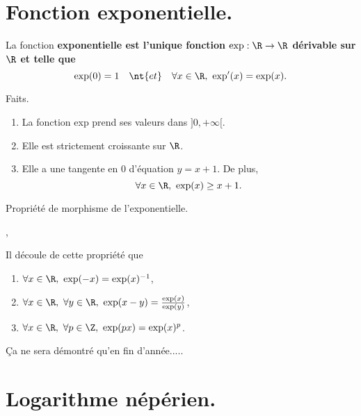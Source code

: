\documentclass[11pt]{article}
\begin{document}


\thispagestyle{fancy}

\section{Fonction exponentielle.}

\begin{defi}{}{}
    La fonction \bf{exponentielle} est l'unique fonction $\exp:\R\to\R$ dérivable sur $\R$ et telle que
    \begin{equation*}
        \exp(0)=1\quad\nt{et}\quad\forall x\in\R,~\exp'(x)=\exp(x).
    \end{equation*}
\end{defi}

\begin{prop}{Faits.}{}
    \begin{enumerate}
        \item La fonction exp prend ses valeurs dans $]0,+\infty[$.
        \item Elle est strictement croissante sur $\R$.
        \item Elle a une tangente en 0 d'équation $y=x+1$. De plus,
        \begin{equation*}
            \forall x \in \R,~\exp(x)\geq x+1.
        \end{equation*}
    \end{enumerate}
\end{prop}

\begin{thm}{Propriété de morphisme de l'exponentielle.}{}
    \begin{center}
        ,
    \end{center}
    Il découle de cette propriété que
    \begin{enumerate}
        \item $\forall x \in \R, ~ \exp(-x)=\exp(x)^{-1}$,
        \item $\forall x \in \R, ~ \forall y \in \R, ~ \exp(x-y)=\frac{\exp(x)}{\exp(y)}$,
        \item $\forall x \in \R, ~ \forall p \in \Z, ~ \exp(px)=\exp(x)^p$.
    \end{enumerate}
    \tcblower
    Ça ne sera démontré qu'en fin d'année.....
\end{thm}

\section{Logarithme népérien.}
\end{document}
